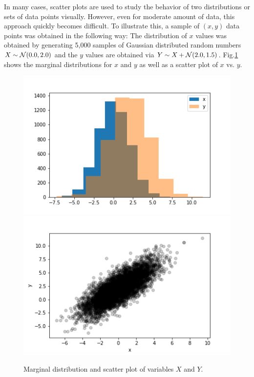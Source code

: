 \documentclass[BCOR=1mm, DIV=calc,10pt,
twoside=true,
twocolumn,
headings=normal]{scrartcl}
\newcommand{\fig}{Fig.}
\begin{document}
In many cases, scatter plots are used to study the behavior of two distributions or sets of data points visually. However, even for moderate amount of data, this approach quickly becomes difficult. To illustrate this, a sample of $(x,y)$ data points was obtained in the following way: The distribution of $x$ values was obtained by generating 5,000 samples of Gaussian distributed random numbers $X \sim {\cal N}(0.0,2.0)$ and the $y$ values are obtained via $Y \sim X +  {\cal N}(2.0,1.5)$. \fig \ref{fig:scatter} shows the marginal distributions for $x$ and $y$ as well as a scatter plot of $x$ vs. $y$.

\begin{figure}
\begin{center}
\includegraphics[scale=0.5]{../figures/marginal} \includegraphics[scale=0.5]{../figures/scatter}
\caption{\label{fig:scatter} Marginal distribution and scatter plot of variables $X$ and $Y$.}
\end{center}
\end{figure}
\end{document}
